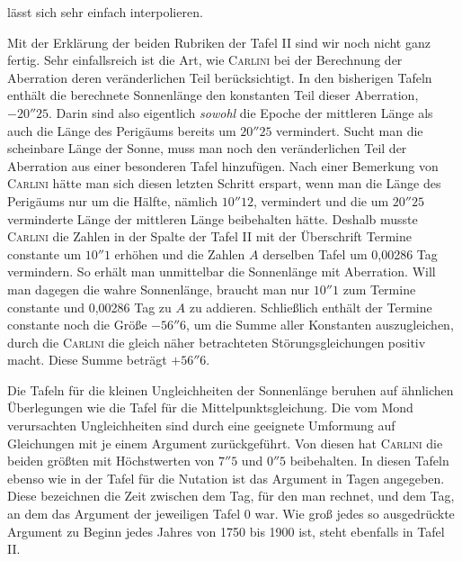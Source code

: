lässt sich sehr einfach interpolieren.

Mit der Erklärung der beiden Rubriken der Tafel II sind wir noch nicht ganz fertig. Sehr einfallsreich ist die Art, wie \textsc{Carlini} bei der Berechnung der Aberration deren veränderlichen Teil berücksichtigt. In den bisherigen Tafeln enthält die berechnete Sonnenlänge den konstanten Teil dieser Aberration, $-20''25$. Darin sind also eigentlich \emph{sowohl} die Epoche der mittleren Länge als auch die Länge des Perigäums bereits um $20''25$ vermindert. Sucht man die scheinbare Länge der Sonne, muss man noch den veränderlichen Teil der Aberration aus einer besonderen Tafel hinzufügen. Nach einer Bemerkung von \textsc{Carlini} hätte man sich diesen letzten Schritt erspart, wenn man die Länge des Perigäums nur um die Hälfte, nämlich $10''12$, vermindert und die um $20''25$ verminderte Länge der mittleren Länge beibehalten hätte. Deshalb musste \textsc{Carlini} die Zahlen in der Spalte der Tafel II mit der Überschrift Termine constante um $10''1$ erhöhen und die Zahlen $A$ derselben Tafel um 0,00286 Tag vermindern. So erhält man unmittelbar die Sonnenlänge mit Aberration. Will man dagegen die wahre Sonnenlänge, braucht man nur $10''1$ zum Termine constante und 0,00286 Tag zu $A$ zu addieren. Schließlich enthält der Termine constante noch die Größe $-56''6$, um die Summe aller Konstanten auszugleichen, durch die \textsc{Carlini} die gleich näher betrachteten Störungsgleichungen positiv macht. Diese Summe beträgt $+56''6$.

Die Tafeln für die kleinen Ungleichheiten der Sonnenlänge beruhen auf ähnlichen Überlegungen wie die Tafel für die Mittelpunktsgleichung. Die vom Mond verursachten Ungleichheiten sind durch eine geeignete Umformung auf Gleichungen mit je einem Argument zurückgeführt. Von diesen hat \textsc{Carlini} die beiden größten mit Höchstwerten von $7''5$ und $0''5$ beibehalten. In diesen Tafeln ebenso wie in der Tafel für die Nutation ist das Argument in Tagen angegeben. Diese bezeichnen die Zeit zwischen dem Tag, für den man rechnet, und dem Tag, an dem das Argument der jeweiligen Tafel 0 war. Wie groß jedes so ausgedrückte Argument zu Beginn jedes Jahres von 1750 bis 1900 ist, steht ebenfalls in Tafel II.

